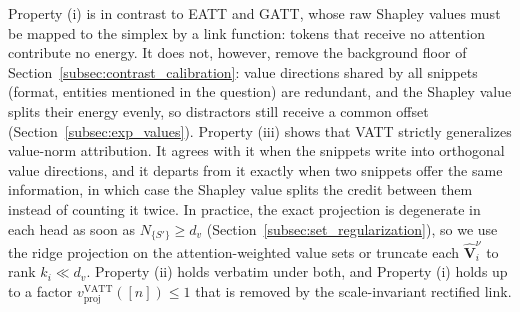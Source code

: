 \documentclass{article}
\begin{document}
Property (i) is in contrast to EATT and GATT, whose raw Shapley values must be mapped to the simplex by a link function: tokens that receive no attention contribute no energy. It does not, however, remove the background floor of Section~\ref{subsec:contrast_calibration}: value directions shared by all snippets (format, entities mentioned in the question) are redundant, and the Shapley value splits their energy evenly, so distractors still receive a common offset (Section~\ref{subsec:exp_values}). Property (iii) shows that VATT strictly generalizes value-norm attribution. It agrees with it when the snippets write into orthogonal value directions, and it departs from it exactly when two snippets offer the same information, in which case the Shapley value splits the credit between them instead of counting it twice. In practice, the exact projection is degenerate in each head as soon as $N_{\{S'\}} \ge d_v$ (Section~\ref{subsec:set_regularization}), so we use the ridge projection on the attention-weighted value sets or truncate each $\hat{\mathbf{V}}^\nu_i$ to rank $k_i \ll d_v$. Property (ii) holds verbatim under both, and Property (i) holds up to a factor $v^{\text{VATT}}_{\text{proj}}([n]) \le 1$ that is removed by the scale-invariant rectified link.
\end{document}

